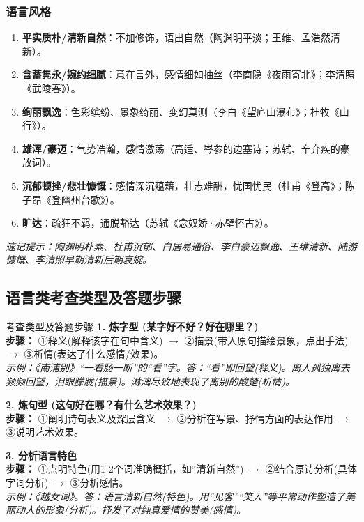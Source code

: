 \documentclass[11pt, a4paper]{ctexart}
\begin{document}
\subsubsection{语言风格}
\begin{enumerate}
    \item \textbf{平实质朴/清新自然}：不加修饰，语出自然（陶渊明平淡；王维、孟浩然清新）。
    \item \textbf{含蓄隽永/婉约细腻}：意在言外，感情细如抽丝（李商隐《夜雨寄北》；李清照《武陵春》）。
    \item \textbf{绚丽飘逸}：色彩缤纷、景象绮丽、变幻莫测（李白《望庐山瀑布》；杜牧《山行》）。
    \item \textbf{雄浑/豪迈}：气势浩瀚，感情激荡（高适、岑参的边塞诗；苏轼、辛弃疾的豪放词）。
    \item \textbf{沉郁顿挫/悲壮慷慨}：感情深沉蕴藉，壮志难酬，忧国忧民（杜甫《登高》；陈子昂《登幽州台歌》）。
    \item \textbf{旷达}：疏狂不羁，通脱豁达（苏轼《念奴娇·赤壁怀古》）。
\end{enumerate}
\textit{速记提示：陶渊明朴素、杜甫沉郁、白居易通俗、李白豪迈飘逸、王维清新、陆游慷慨、李清照早期清新后期哀婉。}

\subsection{语言类考查类型及答题步骤}

\begin{tipsbox}{考查类型及答题步骤}
\textbf{1. 炼字型 (某字好不好？好在哪里？)}\\
\textbf{步骤：} ①释义(解释该字在句中含义) $\rightarrow$ ②描景(带入原句描绘景象，点出手法) $\rightarrow$ ③析情(表达了什么感情/效果)。\\
\textit{示例：《南浦别》“一看肠一断”的“看”字。答：“看”即回望(释义)。离人孤独离去频频回望，泪眼朦胧(描景)。淋漓尽致地表现了离别的酸楚(析情)。}

\vspace{0.3cm}
\textbf{2. 炼句型 (这句好在哪？有什么艺术效果？)}\\
\textbf{步骤：} ①阐明诗句表义及深层含义 $\rightarrow$ ②分析在写景、抒情方面的表达作用 $\rightarrow$ ③说明艺术效果。

\vspace{0.3cm}
\textbf{3. 分析语言特色}\\
\textbf{步骤：} ①点明特色(用1-2个词准确概括，如“清新自然”) $\rightarrow$ ②结合原诗分析(具体字词分析) $\rightarrow$ ③分析感情。\\
\textit{示例：《越女词》。答：语言清新自然(特色)。用“见客”“笑入”等平常动作塑造了美丽动人的形象(分析)。抒发了对纯真爱情的赞美(感情)。}
\end{tipsbox}
\end{document}
